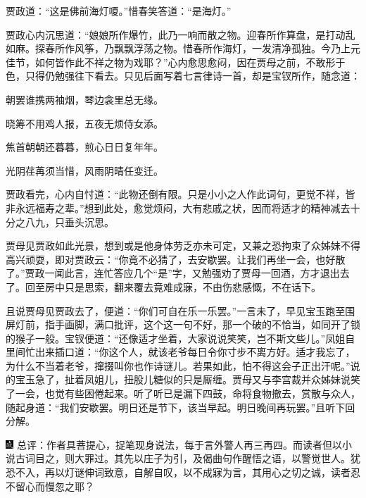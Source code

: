 贾政道：“这是佛前海灯嗄。”惜春笑答道：“是海灯。”

贾政心内沉思道：“娘娘所作爆竹，此乃一响而散之物。迎春所作算盘，是打动乱如麻。探春所作风筝，乃飘飘浮荡之物。惜春所作海灯，一发清净孤独。今乃上元佳节，如何皆作此不祥之物为戏耶？”心内愈思愈闷，因在贾母之前，不敢形于色，只得仍勉强往下看去。只见后面写着七言律诗一首，却是宝钗所作，随念道：

朝罢谁携两袖烟，琴边衾里总无缘。

晓筹不用鸡人报，五夜无烦侍女添。

焦首朝朝还暮暮，煎心日日复年年。

光阴荏苒须当惜，风雨阴晴任变迁。

贾政看完，心内自忖道：“此物还倒有限。只是小小之人作此词句，更觉不祥，皆非永远福寿之辈。”想到此处，愈觉烦闷，大有悲戚之状，因而将适才的精神减去十分之八九，只垂头沉思。

贾母见贾政如此光景，想到或是他身体劳乏亦未可定，又兼之恐拘束了众姊妹不得高兴顽耍，即对贾政云：“你竟不必猜了，去安歇罢。让我们再坐一会，也好散了。”贾政一闻此言，连忙答应几个“是”字，又勉强劝了贾母一回酒，方才退出去了。回至房中只是思索，翻来覆去竟难成寐，不由伤悲感慨，不在话下。

且说贾母见贾政去了，便道：“你们可自在乐一乐罢。”一言未了，早见宝玉跑至围屏灯前，指手画脚，满口批评，这个这一句不好，那一个破的不恰当，如同开了锁的猴子一般。宝钗便道：“还像适才坐着，大家说说笑笑，岂不斯文些儿。”凤姐自里间忙出来插口道：“你这个人，就该老爷每日令你寸步不离方好。适才我忘了，为什么不当着老爷，撺掇叫你也作诗谜儿。若果如此，怕不得这会子正出汗呢。”说的宝玉急了，扯着凤姐儿，扭股儿糖似的只是厮缠。贾母又与李宫裁并众姊妹说笑了一会，也觉有些困倦起来。听了听已是漏下四鼓，命将食物撤去，赏散与众人，随起身道：“我们安歇罢。明日还是节下，该当早起。明日晚间再玩罢。”且听下回分解。

{\includegraphics[width=3mm]{../Images/00005}  \kaishu 总评：作者具菩提心，捉笔现身说法，每于言外警人再三再四。而读者但以小说古词目之，则大罪过。其先以庄子为引，及偈曲句作醒悟之语，以警觉世人。犹恐不入，再以灯谜伸词致意，自解自叹，以不成寐为言，其用心之切之诚，读者忍不留心而慢忽之耶？}